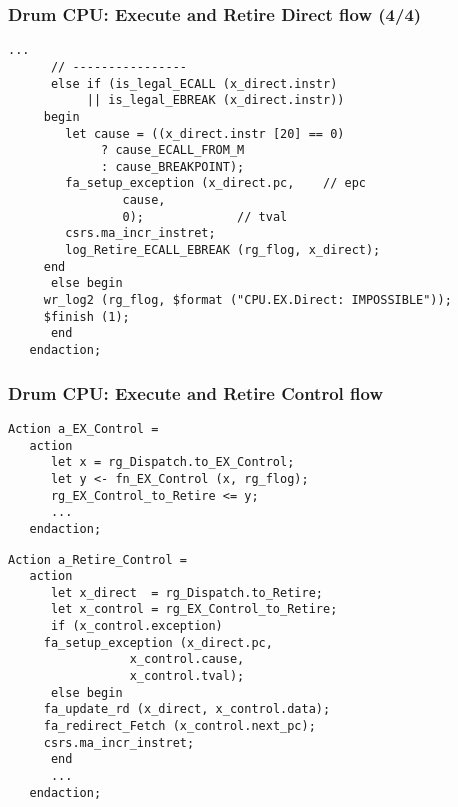 
\begin{frame}[fragile]
\frametitle{Drum CPU: Execute and Retire Direct flow (4/4)}

\footnotesize

\begin{minipage}{0.725\textwidth}
\begin{Verbatim}[frame=single, label=From src\_Drum/CPU.bsv]
      ...
      // ----------------
      else if (is_legal_ECALL (x_direct.instr)
	       || is_legal_EBREAK (x_direct.instr))
	 begin
	    let cause = ((x_direct.instr [20] == 0)
			 ? cause_ECALL_FROM_M
			 : cause_BREAKPOINT);
	    fa_setup_exception (x_direct.pc,    // epc
				cause,
				0);             // tval
	    csrs.ma_incr_instret;
	    log_Retire_ECALL_EBREAK (rg_flog, x_direct);
	 end
      else begin
	 wr_log2 (rg_flog, $format ("CPU.EX.Direct: IMPOSSIBLE"));
	 $finish (1);
      end
   endaction;
\end{Verbatim}
\end{minipage}

\end{frame}


\begin{frame}[fragile]
\frametitle{Drum CPU: Execute and Retire Control flow}

\footnotesize

\begin{minipage}{0.725\textwidth}
\begin{Verbatim}[frame=single, label=From src\_Drum/CPU.bsv]
   Action a_EX_Control =
   action
      let x = rg_Dispatch.to_EX_Control;
      let y <- fn_EX_Control (x, rg_flog);
      rg_EX_Control_to_Retire <= y;
      ...
   endaction;
\end{Verbatim}
\end{minipage}

\begin{minipage}{0.725\textwidth}
\begin{Verbatim}[frame=single]
   Action a_Retire_Control =
   action
      let x_direct  = rg_Dispatch.to_Retire;
      let x_control = rg_EX_Control_to_Retire;
      if (x_control.exception)
	 fa_setup_exception (x_direct.pc,
			     x_control.cause,
			     x_control.tval);
      else begin
	 fa_update_rd (x_direct, x_control.data);
	 fa_redirect_Fetch (x_control.next_pc);
	 csrs.ma_incr_instret;
      end
      ...
   endaction;
\end{Verbatim}
\end{minipage}

\end{frame}


